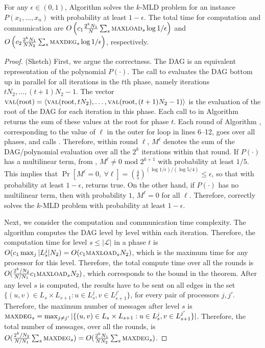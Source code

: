 \begin{theorem}
\label{thm:parmaxwt}
For any $\epsilon\in(0, 1)$,
Algorithm \parmaxwt{} solves the \textsc{$k$-MLD} problem for an
instance $P(x_1,\ldots,x_n)$ with probability at least $1-\epsilon$. The total time for
computation and communication are $O\left(c_1\frac{2^kN_1}{N}\sum_s \textsc{maxload}{}_s\log{1/\epsilon}\right)$ 
and $O\left(c_2\frac{2^kN_1}{N N_2}\sum_s \textsc{maxdeg}{}_s\log{1/\epsilon}\right)$, respectively.
\end{theorem}
\begin{proof} (Sketch)
First, we argue the correctness. 
The DAG is an equivalent representation of the polynomial $P(\cdot)$. 
The call to \parcircuit{} evaluates the DAG bottom up in parallel for all iterations in the
$t$th phase, namely iterations $tN_2,\ldots,(t+1)N_2-1$. The vector
$\textsc{val}(\text{root})=\langle \textsc{val}(\text{root}, tN_2),  \ldots ,\textsc{val}(\text{root}, (t+1)N_2-1)\rangle$
is the evaluation of the root of the DAG for each iteration in this phase.
Each call to \parcircuit{} in Algorithm \parmaxwt{}
returns the sum of these values at the root for phase $t$.
Each round of Algorithm \parmaxwt{}, corresponding to the value of
$\ell$ in the outer for loop in lines 6--12, goes over all phases, and
calls \parcircuit{}. Therefore, within round $\ell$, $M^{\ell}$ denotes the
sum of the DAG/polynomial evaluation over all the $2^k$ iterations within that round.
If $P(\cdot)$ has a multilinear term,
from \cite{koutis:icalp08,williams2009finding}, $M^{\ell}\neq 0 \text{ mod }2^{k+1}$ with
probability at least $1/5$. This implies that 
$\Pr[M^{\ell} = 0,\ \forall \ell] = (\frac{4}{5})^{(\log{1/\epsilon})/(\log{5/4})}\leq\epsilon$,
so that with probability at least $1-\epsilon$, \parmaxwt{} returns true.  On the other hand,
if $P(\cdot)$ has no multilinear term, then with probability $1$, $M^{\ell}=0$ for all $\ell$.
Therefore, \parmaxwt{} correctly solves the \textsc{$k$-MLD} problem with probability
at least $1-\epsilon$.

Next, we consider the computation and communication time complexity. 
The algorithm \parcircuit{} computes the DAG level by level within each iteration.
Therefore, the computation time for level $s\leq |\mathcal{L}|$ in a phase $t$ is 
$O(c_1\max_j |L_s^j| N_2) = O(c_1\textsc{maxload}{}_sN_2)$, which is the maximum time for any processor
for this level. Therefore, the total compute time over all the rounds is
$O(\frac{2^k/N_2}{N/N_1} c_1\textsc{maxload}{}_sN_2)$, which corresponds to the bound in the theorem.
After any level $s$ is computed, the results have to be sent on all edges in the set 
$\{(u, v)\in L_s\times L_{s+1}: u\in L_s^j, v\in L_{s+1}^{j'}\}$, for every pair of
processors $j, j'$. Therefore, the maximum number of messages after level $s$ is
$\textsc{maxdeg}{}_s = \max_{j\neq j'} |\{(u, v)\in L_s\times L_{s+1}: u\in L_s^j, v\in L_{s+1}^{j'}\}|$.
Therefore, the total number of messages, over all the rounds, is
$O(\frac{2^k/N_2}{N/N_1} \sum_s \textsc{maxdeg}{}_s) = O(\frac{2^kN_1}{N N_2}\sum_s \textsc{maxdeg}{}_s)$.
\end{proof}

